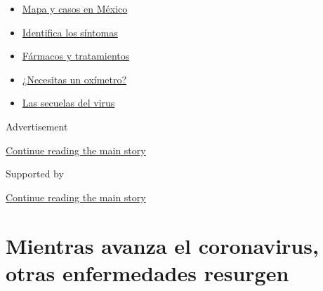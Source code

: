 \begin{itemize}
\tightlist
\item
  \href{https://www.nytimes3xbfgragh.onion/es/interactive/2020/espanol/america-latina/coronavirus-en-mexico.html?name=styln-coronavirus-es\&region=TOP_BANNER\&variant=undefined\&block=storyline_menu_recirc\&action=click\&pgtype=Article\&impression_id=ebbe9300-e39c-11ea-8ef3-3565b30fff31}{Mapa
  y casos en México}
\item
  \href{https://www.nytimes3xbfgragh.onion/es/interactive/2020/08/06/espanol/ciencia-y-tecnologia/tengo-covid-19-sintomas.html?name=styln-coronavirus-es\&region=TOP_BANNER\&variant=undefined\&block=storyline_menu_recirc\&action=click\&pgtype=Article\&impression_id=ebbe9301-e39c-11ea-8ef3-3565b30fff31}{Identifica
  los síntomas}
\item
  \href{https://www.nytimes3xbfgragh.onion/es/interactive/2020/science/coronavirus-tratamientos-curas.html?name=styln-coronavirus-es\&region=TOP_BANNER\&variant=undefined\&block=storyline_menu_recirc\&action=click\&pgtype=Article\&impression_id=ebbe9302-e39c-11ea-8ef3-3565b30fff31}{Fármacos
  y tratamientos}
\item
  \href{https://www.nytimes3xbfgragh.onion/es/2020/04/29/espanol/estilos-de-vida/oximetro-para-que-sirve.html?name=styln-coronavirus-es\&region=TOP_BANNER\&variant=undefined\&block=storyline_menu_recirc\&action=click\&pgtype=Article\&impression_id=ebbe9303-e39c-11ea-8ef3-3565b30fff31}{¿Necesitas
  un oxímetro?}
\item
  \href{https://www.nytimes3xbfgragh.onion/es/2020/07/02/espanol/ciencia-y-tecnologia/sobrevivientes-coronavirus-recuperacion.html?name=styln-coronavirus-es\&region=TOP_BANNER\&variant=undefined\&block=storyline_menu_recirc\&action=click\&pgtype=Article\&impression_id=ebbe9304-e39c-11ea-8ef3-3565b30fff31}{Las
  secuelas del virus}
\end{itemize}

Advertisement

\protect\hyperlink{after-top}{Continue reading the main story}

Supported by

\protect\hyperlink{after-sponsor}{Continue reading the main story}

\hypertarget{mientras-avanza-el-coronavirus-otras-enfermedades-resurgen}{%
\section{Mientras avanza el coronavirus, otras enfermedades
resurgen}\label{mientras-avanza-el-coronavirus-otras-enfermedades-resurgen}}

